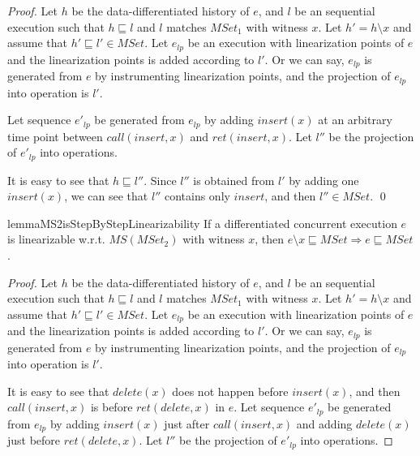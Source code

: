 {\begin {proof}
Let $h$ be the data-differentiated history of $e$, and $l$ be an sequential execution such that $h \sqsubseteq l$ and $l$ matches $\textit{MSet}_1$ with witness $x$. Let $h'=h \setminus x$ and assume that $h' \sqsubseteq l' \in \textit{MSet}$. Let $e_{\textit{lp}}$ be an execution with linearization points of $e$ and the linearization points is added according to $l'$. Or we can say, $e_{\textit{lp}}$ is generated from $e$ by instrumenting linearization points, and the projection of $e_{\textit{lp}}$ into operation is $l'$.

Let sequence $e'_{\textit{lp}}$ be generated from $e_{\textit{lp}}$ by adding $\textit{insert}(x)$ at an arbitrary time point between $\textit{call}(\textit{insert},x)$ and $\textit{ret}(\textit{insert},x)$. Let $l''$ be the projection of $e'_{\textit{lp}}$ into operations.

It is easy to see that $h \sqsubseteq l''$. Since $l''$ is obtained from $l'$ by adding one $\textit{insert}(x)$, we can see that $l''$ contains only $\textit{insert}$, and then $l'' \in \textit{MSet}$. \qed
\end {proof}


\begin{restatable}{lemma}{MS2isStepByStepLinearizability}
\label{lemma:MS2 is step-by-step linearizability}
If a differentiated concurrent execution $e$ is linearizable w.r.t. $\textit{MS}(\textit{MSet}_2)$ with witness $x$, then $e \setminus x \sqsubseteq \textit{MSet} \Rightarrow e \sqsubseteq \textit{MSet}$.
\end{restatable}

\begin {proof}
Let $h$ be the data-differentiated history of $e$, and $l$ be an sequential execution such that $h \sqsubseteq l$ and $l$ matches $\textit{MSet}_1$ with witness $x$. Let $h'=h \setminus x$ and assume that $h' \sqsubseteq l' \in \textit{MSet}$. Let $e_{\textit{lp}}$ be an execution with linearization points of $e$ and the linearization points is added according to $l'$. Or we can say, $e_{\textit{lp}}$ is generated from $e$ by instrumenting linearization points, and the projection of $e_{\textit{lp}}$ into operation is $l'$.

It is easy to see that $\textit{delete}(x)$ does not happen before $\textit{insert}(x)$, and then $\textit{call}(\textit{insert},x)$ is before $\textit{ret}(\textit{delete},x)$ in $e$. Let sequence $e'_{\textit{lp}}$ be generated from $e_{\textit{lp}}$ by adding $\textit{insert}(x)$ just after $\textit{call}(\textit{insert},x)$ and adding $\textit{delete}(x)$ just before $\textit{ret}(\textit{delete},x)$. Let $l''$ be the projection of $e'_{\textit{lp}}$ into operations.


\end{proof}}

